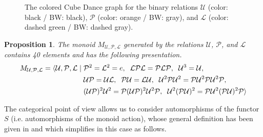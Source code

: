 \documentclass[10pt]{amsart}
\newtheorem{proposition}{Proposition}
\begin{document}
\begin{figure}[t!]
\begin{center}
{
}
\end{center}
\caption{The colored Cube Dance graph for the binary relations $\mathcal{U}$ (color: black / BW: black), $\mathcal{P}$ (color: orange / BW: gray), and $\mathcal{L}$ (color: dashed green / BW: dashed gray).}
\label{fig:UPL_monoids_graphs}
\end{figure}

\begin{proposition}
The monoid $M_{\mathcal{U},\mathcal{P}, \mathcal{L}}$ generated by the relations $\mathcal{U}$, $\mathcal{P}$, and $\mathcal{L}$ contains 40 elements and has the following presentation.
$$\begin{aligned} M_{\mathcal{U},\mathcal{P}, \mathcal{L}} =  \langle \mathcal{U}, \mathcal{P}, \mathcal{L} \mid {} & \mathcal{P}^2=\mathcal{L}^2=e, \hspace{0.2cm} \mathcal{LPL}=\mathcal{PLP}, \hspace{0.2cm} \mathcal{U}^3=\mathcal{U}, \\
					&  \mathcal{U}\mathcal{P}=\mathcal{U}\mathcal{L}, \hspace{0.2cm} \mathcal{P}\mathcal{U}=\mathcal{L}\mathcal{U}, \hspace{0.2cm} \mathcal{U}^2\mathcal{P}\mathcal{U}^2=\mathcal{P}\mathcal{U}^2\mathcal{P}\mathcal{U}^2\mathcal{P}, \\
					&  (\mathcal{U}\mathcal{P})^2\mathcal{U}^2 = \mathcal{P} (\mathcal{U}\mathcal{P})^2\mathcal{U}^2 \mathcal{P}, \hspace{0.2cm} \mathcal{U}^2(\mathcal{P}\mathcal{U})^2 = \mathcal{P} \mathcal{U}^2(\mathcal{P}\mathcal{U})^2 \mathcal{P} \rangle \end{aligned} $$
\end{proposition}

The categorical point of view allows us to consider automorphisms of the functor $S$ (i.e. automorphisms of the monoid action), whose general definition has been given in \cite{Popoff2018,Popoff2020} and which simplifies in this case as follows.
\end{document}
